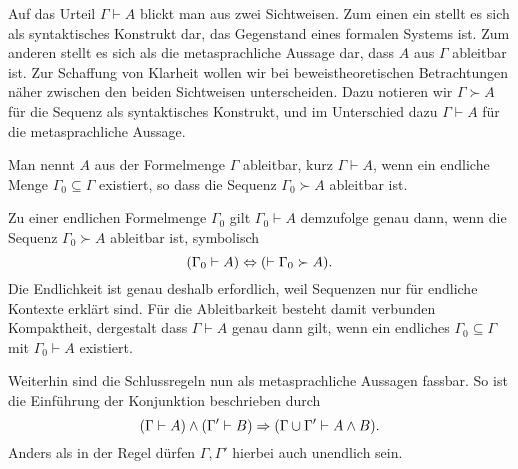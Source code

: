 Auf das Urteil $\Gamma\vdash A$ blickt man aus zwei Sichtweisen. Zum
einen ein stellt es sich als syntaktisches Konstrukt dar, das Gegenstand
eines formalen Systems ist. Zum anderen stellt es sich als die
metasprachliche Aussage dar, dass $A$ aus $\Gamma$ ableitbar ist. Zur
Schaffung von Klarheit wollen wir bei beweistheoretischen Betrachtungen
näher zwischen den beiden Sichtweisen unterscheiden. Dazu notieren
wir $\Gamma\succ A$ für die Sequenz als syntaktisches Konstrukt,
und im Unterschied dazu $\Gamma\vdash A$ für die metasprachliche Aussage.
\begin{Definition}[Ableitbarkeit]\newlinefirst
Man nennt $A$ aus der Formelmenge $\Gamma$ ableitbar, kurz
$\Gamma\vdash A$, wenn ein endliche Menge $\Gamma_0\subseteq\Gamma$
existiert, so dass die Sequenz $\Gamma_0\succ A$ ableitbar ist.
\end{Definition}
Zu einer endlichen Formelmenge $\Gamma_0$ gilt $\Gamma_0\vdash A$
demzufolge genau dann, wenn die Sequenz $\Gamma_0\succ A$ ableitbar ist,
symbolisch%
\[(\Gamma_0\vdash A) \Leftrightarrow (\vdash \Gamma_0\succ A).\]
Die Endlichkeit ist genau deshalb erfordlich, weil Sequenzen nur für
endliche Kontexte erklärt sind. Für die Ableitbarkeit besteht damit
verbunden Kompaktheit, dergestalt dass $\Gamma\vdash A$ genau dann gilt,
wenn ein endliches $\Gamma_0\subseteq\Gamma$ mit $\Gamma_0\vdash A$
existiert.

Weiterhin sind die Schlussregeln nun als metasprachliche Aussagen
fassbar. So ist die Einführung der Konjunktion beschrieben durch%
\[(\Gamma\vdash A)\land (\Gamma'\vdash B)\Rightarrow (\Gamma\cup\Gamma'\vdash A\land B).\]
Anders als in der Regel dürfen $\Gamma,\Gamma'$ hierbei auch
unendlich sein.

